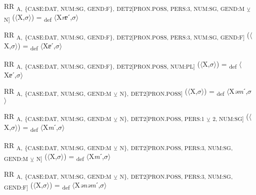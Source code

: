{\begin{exe}
 RR \textsubscript{A,} \textsubscript{\{CASE:DAT, NUM:SG, GEND:F\},} \textsubscript{DET2[PRON.POSS, PERS:3, NUM:SG, GEND:M} \textsubscript{${\veebar}$}\textsubscript{ N]} ($\langle$X,$\sigma $$\rangle$) = \textsubscript{def} $\langle$X\textit{rɐ}ˊ,$\sigma $$\rangle$
\end{exe}

\begin{exe}
 RR \textsubscript{A,} \textsubscript{\{CASE:DAT, NUM:SG, GEND:F\},} \textsubscript{DET2[PRON.POSS, PERS:3, NUM:SG, GEND:F]} ($\langle$X,$\sigma $$\rangle$) = \textsubscript{def} $\langle$X\textit{ɐ}ˊ,$\sigma $$\rangle$
\end{exe}

\begin{exe}
 RR \textsubscript{A,} \textsubscript{\{CASE:DAT, NUM:SG, GEND:F\},} \textsubscript{DET2[PRON.POSS, NUM:PL]} ($\langle$X,$\sigma $$\rangle$) = \textsubscript{def} $\langle$X\textit{ɐ}ˊ,$\sigma $$\rangle$
\end{exe}

\begin{exe}
 RR \textsubscript{A,} \textsubscript{\{CASE:DAT, NUM:SG, GEND:M} \textsubscript{${\veebar}$}\textsubscript{ N\},} \textsubscript{DET2[PRON.POSS]} ($\langle$X,$\sigma $$\rangle$) = \textsubscript{def} $\langle$X\textit{əm}ˊ,$\sigma $$\rangle$
\end{exe}

\begin{exe}
 RR \textsubscript{A,} \textsubscript{\{CASE:DAT, NUM:SG, GEND:M} \textsubscript{${\veebar}$}\textsubscript{ N\},} \textsubscript{DET2[PRON.POSS, PERS:1} \textsubscript{${\veebar}$}\textsubscript{ 2, NUM:SG]} ($\langle$X,$\sigma $$\rangle$) = \textsubscript{def} $\langle$X\textit{m}ˊ,$\sigma $$\rangle$
\end{exe}

\begin{exe}
 RR \textsubscript{A,} \textsubscript{\{CASE:DAT, NUM:SG, GEND:M} \textsubscript{${\veebar}$}\textsubscript{ N\},} \textsubscript{DET2[PRON.POSS, PERS:3, NUM:SG, GEND:M} \textsubscript{${\veebar}$}\textsubscript{ N]} ($\langle$X,$\sigma $$\rangle$) = \textsubscript{def} $\langle$X\textit{m}ˊ,$\sigma $$\rangle$
\end{exe}

\begin{exe}
 RR \textsubscript{A,} \textsubscript{\{CASE:DAT, NUM:SG, GEND:M} \textsubscript{${\veebar}$}\textsubscript{ N\},} \textsubscript{DET2[PRON.POSS, PERS:3, NUM:SG, GEND:F]} ($\langle$X,$\sigma $$\rangle$) = \textsubscript{def} $\langle$X\textit{ənəm}ˊ,$\sigma $$\rangle$
\end{exe}

}
